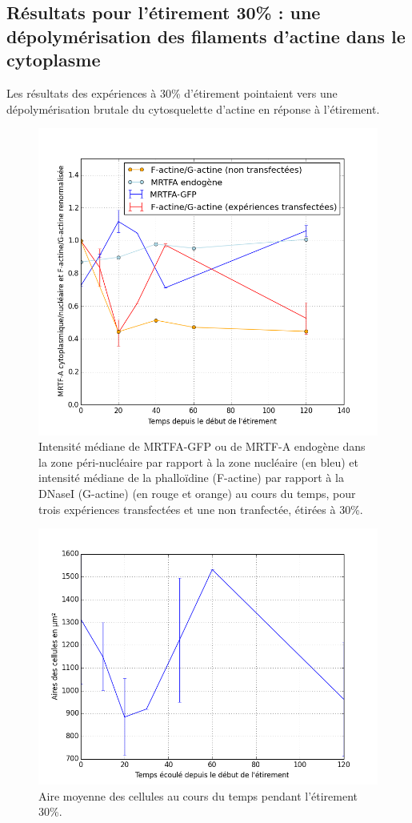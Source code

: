 \documentclass{report}
\begin{document}
\subsection{Résultats pour l'étirement 30\% : une dépolymérisation des filaments d'actine dans le cytoplasme}

Les résultats des expériences à 30\% d'étirement pointaient vers une dépolymérisation brutale du cytosquelette d'actine en réponse à l'étirement. 

\begin{figure}
\includegraphics[scale=0.5]{Figures/Et30_MRTFA_FG.png} 
\caption{\label{Et30_MRTFA_FG} Intensité médiane de MRTFA-GFP ou de MRTF-A endogène dans la zone péri-nucléaire par rapport à la zone nucléaire (en bleu) et intensité médiane de la phalloïdine (F-actine) par rapport à la DNaseI (G-actine) (en rouge et orange)  au cours du temps, pour trois expériences transfectées et une non tranfectée, étirées à 30\%.  }
\end{figure}
\begin{figure}
\includegraphics[scale=0.5]{Figures/Et30_Aires.png} 
\caption{\label{Et30_Aires} Aire moyenne des cellules au cours du temps pendant l'étirement 30\%. }
\end{figure}
\end{document}
